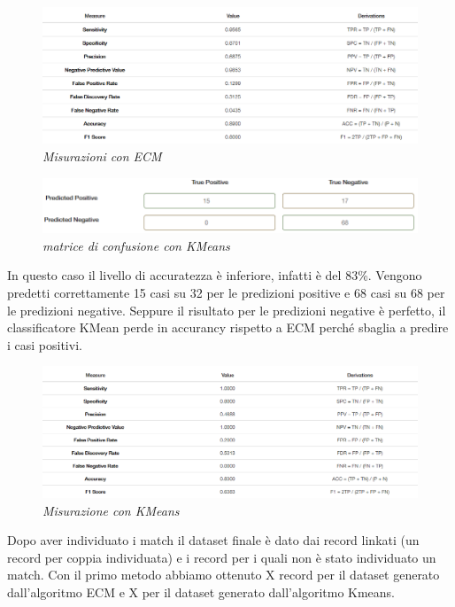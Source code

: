 \documentclass[a4paper,12pt]{article}
\begin{document}
\begin{figure}[H]
	\centering
	\includegraphics[width=1\linewidth]{img/analysis_ecm.png}
	\caption{\textit{Misurazioni con ECM}}
\end{figure}


\begin{figure}[H]
	\centering
	\includegraphics[width=0.8\linewidth]{img/confusion_kmeans.png}
	\caption{\textit{matrice di confusione con KMeans}}
\end{figure}

\noindent In questo caso il livello di accuratezza è inferiore, infatti è del 83\%. Vengono predetti correttamente 15 casi su 32 per le predizioni positive e 68 casi su 68 per le predizioni negative. Seppure il risultato per le predizioni negative è perfetto, il classificatore KMean perde in accurancy rispetto a ECM perché sbaglia a predire i casi positivi. 

\begin{figure}[H]
	\centering
	\includegraphics[width=1\linewidth]{img/analysis_kmeans.png}
	\caption{\textit{Misurazione con KMeans}}
\end{figure}

\noindent Dopo aver individuato i match il dataset finale è dato dai record linkati (un record per coppia individuata) e i record per i quali non è stato individuato un match.
Con il primo metodo abbiamo ottenuto X record per il dataset generato dall'algoritmo ECM e X per il dataset generato dall'algoritmo Kmeans. 
\newpage
\end{document}
